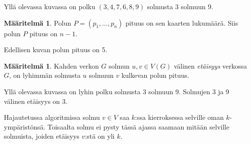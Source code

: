 \documentclass[finnish]{tktltiki2}
\theoremstyle{definition}
\newtheorem{maar}[lau]{Määritelmä}
\theoremstyle{remark}
\begin{document}
Yllä olevassa kuvassa on polku $(3,4,7,6,8,9)$ solmusta $3$ solmuun $9$.

\begin{maar}
    Polun $P = (p_1, \dots, p_n)$ pituus on sen kaarten lukumäärä. Siis polun
    $P$ pituus on $n-1$.
\end{maar}

Edellisen kuvan polun pituus on 5.

\begin{maar}
    Kahden verkon $G$ solmun $u,v \in V(G)$ välinen \emph{etäisyys} verkossa
    $G$, on lyhimmän solmusta $u$ solmuun $v$ kulkevan polun pituus.
\end{maar}

\begin{center}
\end{center}

Yllä olevassa kuvassa on lyhin polku solmusta 3 solmuun 9. Solmujen 3 ja 9
välinen etäisyys on 3.

Hajautetussa algoritmissa solmu $v \in V$ saa $k$:ssa kierroksessa selville
oman $k$-ympäristönsä. Toisaalta solmu ei pysty tässä ajassa saamaan mitään
selville solmuista, joiden etäisyys $v$:stä on yli $k$.
\end{document}
